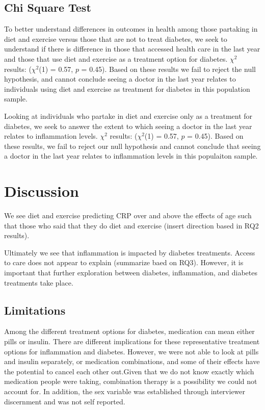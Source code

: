 \documentclass[
  man]{apa6}
\begin{document}
\hypertarget{chi-square-test}{%
\subsection{Chi Square Test}\label{chi-square-test}}

To better understand differences in outcomes in health among those partaking in diet and exercise versus those that are not to treat diabetes, we seek to understand if there is difference in those that accessed health care in the last year and those that use diet and exercise as a treatment option for diabetes. \(\chi^2\) results: (\(\chi^2\)(1) = 0.57, \(p\) = 0.45). Based on these results we fail to reject the null hypothesis, and cannot conclude seeing a doctor in the last year relates to individuals using diet and exercise as treatment for diabetes in this population sample.

Looking at individuals who partake in diet and exercise only as a treatment for diabetes, we seek to answer the extent to which seeing a doctor in the last year relates to inflammation levels. \(\chi^2\) results: (\(\chi^2\)(1) = 0.57, \(p\) = 0.45). Based on these results, we fail to reject our null hypothesis and cannot conclude that seeing a doctor in the last year relates to inflammation levels in this populaiton sample.

\hypertarget{discussion}{%
\section{Discussion}\label{discussion}}

We see diet and exercise predicting CRP over and above the effects of age such that those who said that they do diet and exercise (insert direction based in RQ2 results).

Ultimately we see that inflammation is impacted by diabetes treatments. Access to care does not appear to explain (summarize baed on RQ3). However, it is important that further exploration between diabetes, inflammation, and diabetes treatments take place.

\hypertarget{limitations}{%
\subsection{Limitations}\label{limitations}}

Among the different treatment options for diabetes, medication can mean either pills or insulin. There are different implications for these representative treatment options for inflammation and diabetes. However, we were not able to look at pills and insulin separately, or medication combinations, and some of their effects have the potential to cancel each other out.Given that we do not know exactly which medication people were taking, combination therapy is a possibility we could not account for. In addition, the sex variable was established through interviewer discernment and was not self reported.
\end{document}
